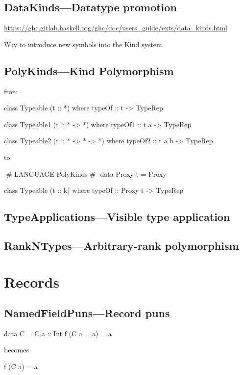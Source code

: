 \documentclass[openany, 12pt]{book}
\begin{document}
\chapter{DataKinds---Datatype promotion}
\url{https://ghc.gitlab.haskell.org/ghc/doc/users_guide/exts/data_kinds.html}

Way to introduce new symbols into the Kind system.

\setcounter{chapter}{13}
\chapter{PolyKinds---Kind Polymorphism}
from
\begin{haskell}{}
class Typeable (t :: *) where
    typeOf :: t -> TypeRep

class Typeable1 (t :: * -> *) where
    typeOf1 :: t a -> TypeRep

class Typeable2 (t :: * -> * -> *) where
    typeOf2 :: t a b -> TypeRep
\end{haskell}

to
\begin{haskell}{}
{-# LANGUAGE PolyKinds #-}
data Proxy t = Proxy

class Typeable (t :: k) where
    typeOf :: Proxy t -> TypeRep
\end{haskell}

\setcounter{chapter}{16}
\chapter{TypeApplications---Visible type application}

\setcounter{chapter}{19}
\chapter{RankNTypes---Arbitrary-rank polymorphism}


\part{Records}

\setcounter{chapter}{6}
\chapter{NamedFieldPuns---Record puns}
\begin{haskell}{}
data C = C {a :: Int}
f (C {a = a}) = a
\end{haskell}
becomes

\begin{haskell}{}
f (C {a}) = a
\end{haskell}
\end{document}
